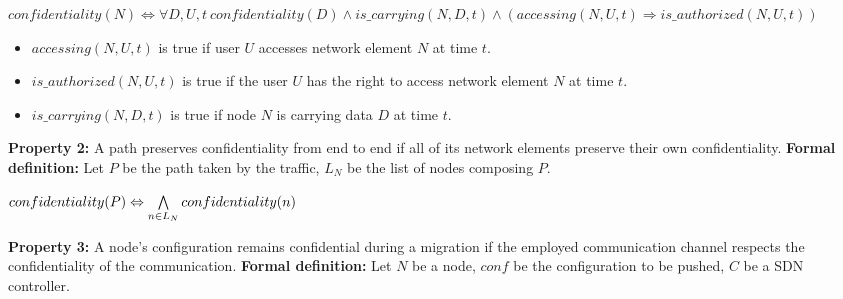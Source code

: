 \begin{myformula}
$confidentiality(N) \Leftrightarrow \forall D,U,t~
confidentiality(D) \wedge is\_carrying(N,D,t) \wedge (accessing(N,U,t) \Rightarrow is\_authorized(N,U,t))$
\end{myformula}


\begin{itemize}
\item $accessing(N,U,t)$ is true if user $U$ accesses network element $N$ at time $t$.
\item $is\_authorized(N,U,t)$ is true if the user $U$ has the right to access network element $N$ at time $t$.
\item $is\_carrying(N,D,t)$ is true if node $N$ is carrying data $D$ at time $t$.
\end{itemize}


\textbf{Property 2:} A path preserves confidentiality from end to end if all of its network elements preserve their own confidentiality.
\newline \textbf{Formal definition:} Let $P$ be the path taken by the traffic, $L_N$ be the list of nodes composing $P$.
\begin{myformula}
$confidentiality(P) \Leftrightarrow \noindent  \bigwedge\limits_{n \in L_N}confidentiality(n)$
\end{myformula}


\textbf{Property 3:} A node's configuration remains confidential during a migration if the employed communication channel respects the confidentiality of the communication.
\newline \textbf{Formal definition:} Let $N$ be a node, $conf$ be the configuration to be pushed, $C$ be a SDN controller.
\newline

